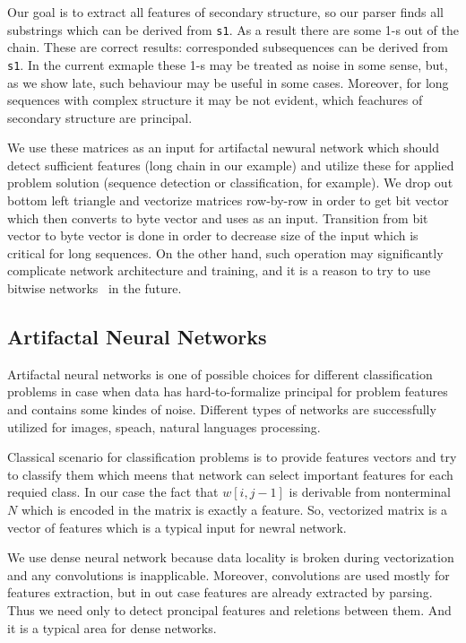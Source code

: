 \documentclass[a4paper,twoside]{article}
\begin{document}
Our goal is to extract all features of secondary structure, so our parser finds all substrings which can be derived from \verb|s1|.
As a result there are some 1-s out of the chain.
These are correct results: corresponded subsequences can be derived from \verb|s1|. 
In the current exmaple these 1-s may be treated as noise in some sense, but, as we show late, such behaviour may be useful in some cases.
Moreover, for long sequences with complex structure it may be not evident, which feachures of secondary structure are principal.

We use these matrices as an input for artifactal newural network which should detect sufficient features (long chain in our example) and utilize these for applied problem solution (sequence detection or classification, for example).
We drop out bottom left triangle and vectorize matrices row-by-row in order to get bit vector which then converts to byte vector and uses as an input.
Transition from bit vector to byte vector is done in order to decrease size of the input which is critical for long sequences. 
On the other hand, such operation may significantly complicate network architecture and training, and it is a reason to try to use bitwise networks~\cite{DBLP:journals:corr:KimS16} in the future.  

\subsection{Artifactal Neural Networks}

\noindent Artifactal neural networks is one of possible choices for different classification problems in case when data has hard-to-formalize principal for problem features and contains some kindes of noise. Different types of networks are successfully utilized for images, speach, natural languages processing.

Classical scenario for classification problems is to provide features vectors and try to classify them which meens that network can select important features for each requied class.
In our case the fact that $w[i,j-1]$ is derivable from nonterminal $N$ which is encoded in the matrix is exactly a feature.
So, vectorized matrix is a vector of features which is a typical input for newral network.

We use dense neural network because data locality is broken during vectorization and any convolutions is inapplicable.
Moreover, convolutions are used mostly for features extraction, but in out case features are already extracted by parsing.
Thus we need only to detect proncipal features and reletions between them.
And it is a typical area for dense networks.
\end{document}
